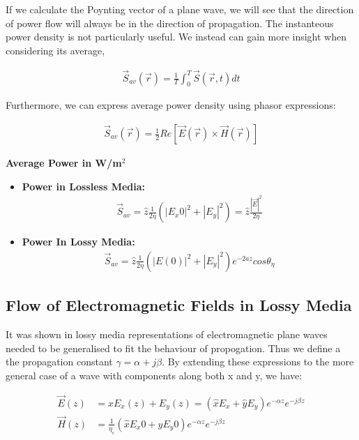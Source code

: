 \documentclass{book}
\begin{document}
If we calculate the Poynting vector of a plane wave, we will see that the direction of power flow will always be in the direction of propagation. The instanteous power density is not particularly useful. We instead can gain more insight when considering its average, 

\begin{align*}
	\vec{S}_{av} (\vec{r}) = \frac{1}{T} \int_{0}^{T} \vec{S}(\vec{r}, t)dt
\end{align*}

Furthermore, we can express average power density using phasor expressions:

\begin{align*}
	\vec{S}_{av}(\vec{r}) = \frac{1}{2} Re [\vec{E} (\vec{r}) \times \vec{H}(\vec{r})]
\end{align*}

\textbf{Average Power in W/m$^2$}
\begin{itemize}
	\item \textbf{Power in Lossless Media:}
	\begin{align*}
		\vec{S}_{av} = \hat{z} \frac{1}{2\eta}(|E_x0|^2 + |E_y|^2) =\hat{z} \frac{|\vec{E}|^2}{2\eta}  
	\end{align*}
	\item \textbf{Power In Lossy Media:}
	\begin{align*}
		\vec{S}_{av} = \hat{z} \frac{1}{2\eta}(|E(0)|^2 + |E_y|^2)  e^{-2az} cos \theta_{\eta}   
	\end{align*}

\end{itemize}

\subsection{Flow of Electromagnetic Fields in Lossy Media}

It was shown in lossy media representations of electromagnetic plane waves needed to be generalised to fit the behaviour of propogation. Thus we define a the propagation constant $\gamma = \alpha + j \beta$. By extending these expressions to the more general case of a wave with components along both x and y, we have:

\begin{align*}
	\vec{E}(z) &= \hat{x} E_x (z) + E_y (z) = (\hat{x} E_x  + \hat{y} E_y ) e^{-\alpha z} e^{-j\beta z} \\
	\vec{H}(z) &=\frac{1}{\eta_c} (\hat{x} E_x 0 + \hat{y} E_y0 ) e^{-\alpha z} e^{-j\beta z}
\end{align*} 
\end{document}
